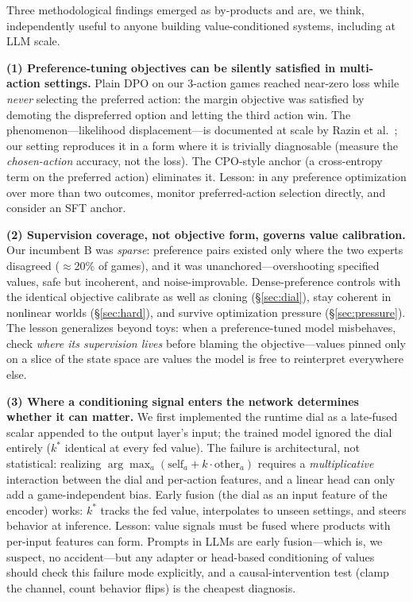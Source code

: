 \documentclass[11pt]{article}
\begin{document}
Three methodological findings emerged as by-products and are, we think, independently useful to
anyone building value-conditioned systems, including at LLM scale.

\textbf{(1) Preference-tuning objectives can be silently satisfied in multi-action settings.}
Plain DPO on our 3-action games reached near-zero loss while \emph{never} selecting the preferred
action: the margin objective was satisfied by demoting the dispreferred option and letting the
third action win. The phenomenon---likelihood displacement---is documented at scale
by Razin et al.~\cite{razin2024unintentional}; our setting reproduces it in a form where it is
trivially diagnosable (measure the \emph{chosen-action} accuracy, not the loss). The CPO-style
anchor (a cross-entropy term on the preferred action) eliminates it. Lesson: in any preference
optimization over more than two outcomes, monitor preferred-action selection directly, and
consider an SFT anchor.

\textbf{(2) Supervision coverage, not objective form, governs value calibration.} Our incumbent
B was \emph{sparse}: preference pairs existed only where the two experts disagreed
($\approx$20\% of games), and it was unanchored---overshooting specified values, safe but
incoherent, and noise-improvable. Dense-preference controls with the identical objective
calibrate as well as cloning (\S\ref{sec:dial}), stay coherent in nonlinear worlds
(\S\ref{sec:hard}), and survive optimization pressure (\S\ref{sec:pressure}). The lesson
generalizes beyond toys: when a preference-tuned model misbehaves, check \emph{where its
supervision lives} before blaming the objective---values pinned only on a slice of the state
space are values the model is free to reinterpret everywhere else.

\textbf{(3) Where a conditioning signal enters the network determines whether it can matter.}
We first implemented the runtime dial as a late-fused scalar appended to the output layer's
input; the trained model ignored the dial entirely ($k^*$ identical at every fed value). The
failure is architectural, not statistical: realizing $\arg\max_a(\mathrm{self}_a + k \cdot
\mathrm{other}_a)$ requires a \emph{multiplicative} interaction between the dial and per-action
features, and a linear head can only add a game-independent bias. Early fusion (the dial as an
input feature of the encoder) works: $k^*$ tracks the fed value, interpolates to unseen settings,
and steers behavior at inference. Lesson: value signals must be fused where products with
per-input features can form. Prompts in LLMs are early fusion---which is, we suspect, no
accident---but any adapter or head-based conditioning of values should check this failure mode
explicitly, and a causal-intervention test (clamp the channel, count behavior flips) is the
cheapest diagnosis.
\end{document}
